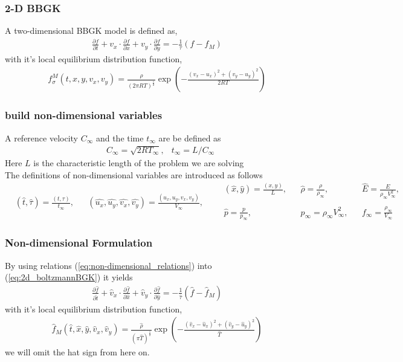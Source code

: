 \begin{frame} \frametitle{2-D BBGK}
	A two-dimensional BBGK model is defined as,
	\begin{align}
	\frac{\partial{f}}{\partial{t}} + 
	v_x\cdot\frac{\partial f}{\partial x} + 
	v_y\cdot\frac{\partial f}{\partial y} =
	- \frac{1}{\tau} (f-f_M)
	\label{eq:2d_boltzmannBGK}
	\end{align}
	with it's local equilibrium distribution function,
	\begin{align}
	f_\sigma^{M}(t,x,y,v_x,v_y)= \frac{\rho}{(2 \pi RT)^{\frac{1}{2}}} \exp\left(-{\frac{(v_x-u_x)^2+(v_y-u_y)^2}{2 R T}} \right)
	\end{align}
\end{frame}

\begin{frame} \frametitle{build non-dimensional variables}
	A reference velocity $C_\infty$ and the time $t_\infty$ are be defined as
	\begin{align}
		&C_{\infty} = \sqrt{2RT_{\infty}}, &t_{\infty} = L/C_{\infty}
	\end{align}
	Here $L$ is the characteristic length of the problem we are solving \\
	The definitions of non-dimensional variables are introduced as follows 
	\begin{subequations}\label{eq:non-dimensional_relations}
		\begin{align}
		&(\hat{t}, \hat{\tau})=\frac{(t,\tau)}{t_\infty},& 
		&(\hat{u_x},\hat{u_y},\hat{v_x},\hat{v_y})=\frac{(u_x,u_y,v_x,v_y)}{V_\infty},&
		\end{align} 
		\begin{align}
		&(\hat{x},\hat{y})=\frac{(x,y)}{L},& 
		&\hat{\rho}=\frac{\rho}{\rho_\infty},&
		&\hat{E}=\frac{E}{\rho_\infty V_\infty^2},& \\
		\nonumber \\ 
		&\hat{p}=\frac{p}{p_\infty},& 
		&p_\infty = \rho_\infty V_\infty^2,& 
		&f_\infty = \frac{\rho_\infty}{V_\infty}&
		\end{align}
	\end{subequations}
\end{frame}

\begin{frame} \frametitle{Non-dimensional Formulation}
	By using relations (\ref{eq:non-dimensional_relations}) into (\ref{eq:2d_boltzmannBGK}) it yields
	\begin{align}
	\frac{\partial \hat{f}}{\partial \hat{t}} + 
	\hat{v}_x\cdot\frac{\partial \hat{f}}{\partial \hat{x}} + 
	\hat{v}_y\cdot\frac{\partial \hat{f}}{\partial \hat{y}} =
	- \frac{1}{\hat{\tau}} (\hat{f}-\hat{f}_M)
	\label{eq:2d_non_dimensional_boltzmannBGK}
	\end{align}
	with it's local equilibrium distribution function,
	\begin{align}
	\hat{f}_{M}(\hat{t},\hat{x},\hat{y},\hat{v}_x,\hat{v}_y) = 
	\frac{\hat{\rho}}{(\pi \hat{T})^{\frac{1}{2}}} 
	\exp\left(-{\frac{(\hat{v}_x-\hat{u}_x)^2+(\hat{v}_y-\hat{u}_y)^2}{\hat{T}}} \right)
	\label{eq:2d_non_dimensional_distrib}
	\end{align}
	we will omit the hat sign from here on.
\end{frame}
